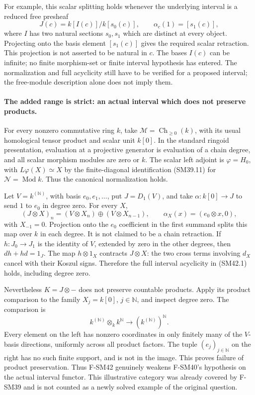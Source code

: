 For example, this scalar splitting holds whenever the
underlying interval is a reduced free presheaf
\[
             J(c)=k[I(c)]/k[s_0(c)],\qquad
                     \alpha_c(1)=[s_1(c)],                  \tag{SM42.5}
\]
where \(I\) has two natural sections \(s_0,s_1\) which
are distinct at every object.  Projecting onto the basis
element \([s_1(c)]\) gives the required scalar
retraction.  This projection is not asserted to be
natural in \(c\).  The bases \(I(c)\) can be infinite;
no finite morphism-set or finite interval hypothesis
has entered.  The normalization and full acyclicity
still have to be verified for a proposed interval;
the free-module description alone does not imply them.

\paragraph{The added range is strict: an actual interval which does not preserve products.}
For every nonzero commutative ring \(k\), take
\(\mathcal M=\operatorname{Ch}_{\ge0}(k)\), with its
usual homological tensor product and scalar unit
\(k[0]\).  In the standard ringoid presentation,
evaluation at a projective generator is evaluation
of a chain degree, and all scalar morphism modules
are zero or \(k\).  The scalar left adjoint is
\(\varphi=H_0\), with
\(L\varphi(X)\simeq X\) by the finite-diagonal
identification (SM39.11) for \(\mathcal N=\operatorname{Mod}k\).
Thus the canonical normalization holds.

Let \(V=k^{(\mathbb N)}\), with basis \(e_0,e_1,\ldots\),
put \(J=D_1(V)\), and take
\(\alpha:k[0]\to J\) to send \(1\) to \(e_0\)
in degree zero.  For every \(X\),
\[
  (J\otimes X)_n=(V\otimes X_n)\oplus(V\otimes X_{n-1}),
        \qquad \alpha_X(x)=(e_0\otimes x,0),                \tag{SM42.6}
\]
with \(X_{-1}=0\).  Projection onto the \(e_0\)
coefficient in the first summand splits this map over
\(k\) in each degree.  It is not claimed to be a chain
retraction.  If \(h:J_0\to J_1\) is the identity of
\(V\), extended by zero in the other degrees, then
\(dh+hd=1_J\).  The map \(h\otimes1_X\) contracts
\(J\otimes X\): the two cross terms involving \(d_X\)
cancel with their Koszul signs.  Therefore the full
interval acyclicity in (SM42.1) holds, including degree
zero.

Nevertheless \(K=J\otimes-\) does not preserve countable
products.  Apply its product comparison to the family
\(X_j=k[0]\), \(j\in\mathbb N\), and inspect degree
zero.  The comparison is
\[
 k^{(\mathbb N)}\otimes_k k^{\mathbb N}
                 \longrightarrow (k^{(\mathbb N)})^{\mathbb N}.
                                                               \tag{SM42.7}
\]
Every element on the left has nonzero coordinates in
only finitely many of the \(V\)-basis directions,
uniformly across all product factors.  The tuple
\((e_j)_{j\in\mathbb N}\) on the right has no such
finite support, and is not in the image.  This proves
failure of product preservation.  Thus F-SM42 genuinely
weakens F-SM40's hypothesis on the actual interval
functor.  This illustrative category was already
covered by F-SM39 and is not counted as a newly solved
example of the original question.

